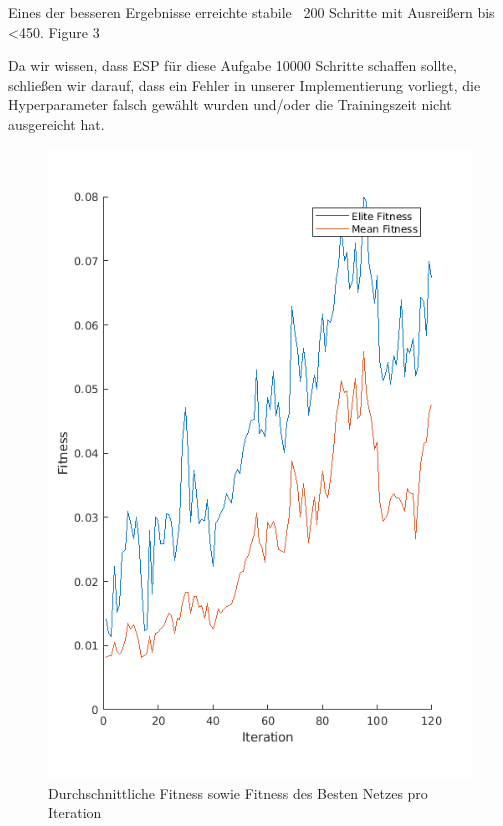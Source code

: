 \documentclass{hbrs-ecta-report}
\begin{document}
Eines der besseren Ergebnisse erreichte stabile ~200 Schritte mit Ausreißern bis <450. Figure 3

Da wir wissen, dass ESP für diese Aufgabe 10000 Schritte schaffen sollte, schließen wir darauf, dass ein Fehler in unserer Implementierung vorliegt, die Hyperparameter falsch gewählt wurden und/oder die Trainingszeit nicht ausgereicht hat.


\begin{figure}[h!]
	\includegraphics[width=0.8\linewidth]{img/poleFitness}
	\caption{Durchschnittliche Fitness sowie Fitness des Besten Netzes pro Iteration}
	\label{fig:fitness}
\end{figure}
\end{document}

